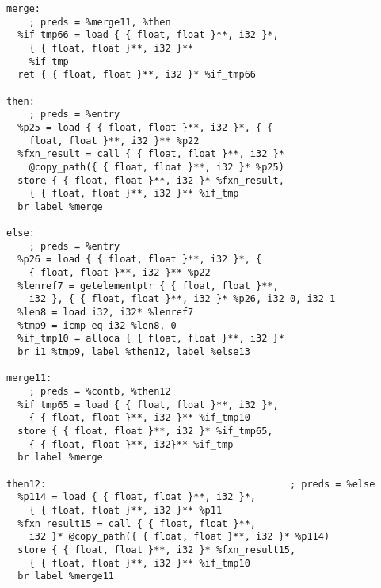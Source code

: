 \documentclass[main.tex]{subfiles}
\begin{document}
{\begin{lstlisting}
merge:                                            
    ; preds = %merge11, %then
  %if_tmp66 = load { { float, float }**, i32 }*, 
    { { float, float }**, i32 }** 
    %if_tmp
  ret { { float, float }**, i32 }* %if_tmp66

then:                                             
    ; preds = %entry
  %p25 = load { { float, float }**, i32 }*, { { 
    float, float }**, i32 }** %p22
  %fxn_result = call { { float, float }**, i32 }*
    @copy_path({ { float, float }**, i32 }* %p25)
  store { { float, float }**, i32 }* %fxn_result,
    { { float, float }**, i32 }** %if_tmp
  br label %merge

else:                                            
    ; preds = %entry
  %p26 = load { { float, float }**, i32 }*, {
    { float, float }**, i32 }** %p22
  %lenref7 = getelementptr { { float, float }**, 
    i32 }, { { float, float }**, i32 }* %p26, i32 0, i32 1
  %len8 = load i32, i32* %lenref7
  %tmp9 = icmp eq i32 %len8, 0
  %if_tmp10 = alloca { { float, float }**, i32 }*
  br i1 %tmp9, label %then12, label %else13

merge11:                                          
    ; preds = %contb, %then12
  %if_tmp65 = load { { float, float }**, i32 }*,
    { { float, float }**, i32 }** %if_tmp10
  store { { float, float }**, i32 }* %if_tmp65,
    { { float, float }**, i32}** %if_tmp
  br label %merge

then12:                                           ; preds = %else
  %p114 = load { { float, float }**, i32 }*,
    { { float, float }**, i32 }** %p11
  %fxn_result15 = call { { float, float }**,
    i32 }* @copy_path({ { float, float }**, i32 }* %p114)
  store { { float, float }**, i32 }* %fxn_result15,
    { { float, float }**, i32 }** %if_tmp10
  br label %merge11


\end{lstlisting}}
\end{document}
